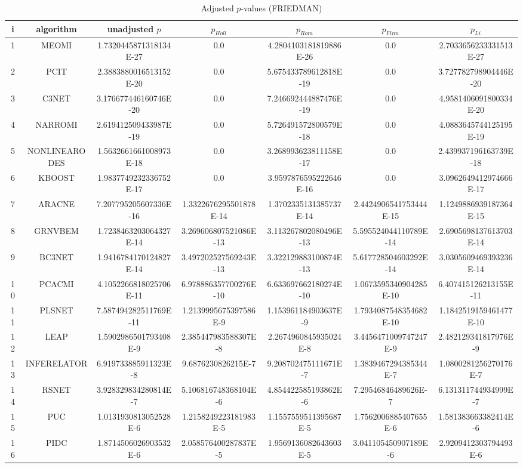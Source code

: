 \documentclass[a4paper,10pt]{article}
\begin{document}
\begin{landscape}
\begin{table}[!htp]
\centering\scriptsize
\caption{Adjusted $p$-values (FRIEDMAN)}
\begin{tabular}{ccccccc}
i&algorithm&unadjusted $p$&$p_{Holl}$&$p_{Rom}$&$p_{Finn}$&$p_{Li}$\\
\hline
1&MEOMI&1.7320445871318134E-27&0.0&4.2804103181819886E-26&0.0&2.7033656233331513E-27\\
2&PCIT&2.3883880016513152E-20&0.0&5.675433789612818E-19&0.0&3.727782798904446E-20\\
3&C3NET&3.176677446160746E-20&0.0&7.246692444887476E-19&0.0&4.9581406091800334E-20\\
4&NARROMI&2.619412509433987E-19&0.0&5.726491572800579E-18&0.0&4.0883645744125195E-19\\
5&NONLINEARODES&1.5632661661008973E-18&0.0&3.268993623811158E-17&0.0&2.439937196163739E-18\\
6&KBOOST&1.9837749232336752E-17&0.0&3.9597876595222646E-16&0.0&3.0962649412974666E-17\\
7&ARACNE&7.207795205607336E-16&1.3322676295501878E-14&1.3702335131385737E-14&2.4424906541753444E-15&1.1249886939187364E-15\\
8&GRNVBEM&1.7238463203064327E-14&3.269606807521086E-13&3.113267802080496E-13&5.595524044110789E-14&2.6905698137613703E-14\\
9&BC3NET&1.9416784170124827E-14&3.497202527569243E-13&3.322129883100874E-13&5.617728504603292E-14&3.0305609469393236E-14\\
10&PCACMI&4.1052266818025706E-11&6.978886357700276E-10&6.633697662180274E-10&1.0673595340904285E-10&6.407415126213155E-11\\
11&PLSNET&7.587494282511769E-11&1.2139995675397586E-9&1.153961184903637E-9&1.7934087548354682E-10&1.1842519159461477E-10\\
12&LEAP&1.5902986501793408E-9&2.385447983588307E-8&2.2674960845935024E-8&3.4456471009747247E-9&2.482129341817976E-9\\
13&INFERELATOR&6.919733885911323E-8&9.6876230826215E-7&9.208702475111671E-7&1.3839467294385344E-7&1.0800281256270176E-7\\
14&RSNET&3.928329834280814E-7&5.106816748368104E-6&4.854422585193862E-6&7.29546846489626E-7&6.131311744934999E-7\\
15&PUC&1.0131930813052528E-6&1.2158249223181983E-5&1.1557559511395687E-5&1.7562006885407655E-6&1.581383663382414E-6\\
16&PIDC&1.8714506026903532E-6&2.058576400287837E-5&1.9569136082643603E-5&3.041105450907189E-6&2.9209412303794493E-6\\

\end{tabular}
\end{table}
\end{landscape}
\end{document}
